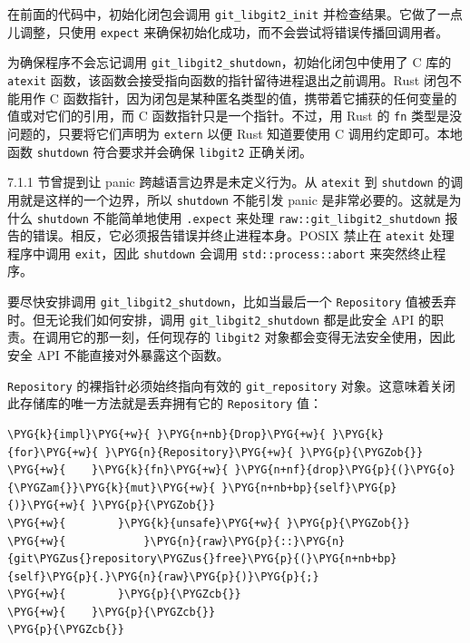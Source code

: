 在前面的代码中，初始化闭包会调用 \texttt{git\_libgit2\_init} 并检查结果。它做了一点儿调整，只使用 \texttt{expect} 来确保初始化成功，而不会尝试将错误传播回调用者。

为确保程序不会忘记调用 \texttt{git\_libgit2\_shutdown}，初始化闭包中使用了 C 库的 \texttt{atexit} 函数，该函数会接受指向函数的指针留待进程退出之前调用。Rust 闭包不能用作 C 函数指针，因为闭包是某种匿名类型的值，携带着它捕获的任何变量的值或对它们的引用，而 C 函数指针只是一个指针。不过，用 Rust 的 \texttt{fn} 类型是没问题的，只要将它们声明为 \texttt{extern} 以便 Rust 知道要使用 C 调用约定即可。本地函数 \texttt{shutdown} 符合要求并会确保 \texttt{libgit2} 正确关闭。

7.1.1 节曾提到让 panic 跨越语言边界是未定义行为。从 \texttt{atexit} 到 \texttt{shutdown} 的调用就是这样的一个边界，所以 \texttt{shutdown} 不能引发 panic 是非常必要的。这就是为什么 \texttt{shutdown} 不能简单地使用 \texttt{.expect} 来处理 \texttt{raw::git\_libgit2\_shutdown} 报告的错误。相反，它必须报告错误并终止进程本身。POSIX 禁止在 \texttt{atexit} 处理程序中调用 \texttt{exit}，因此 \texttt{shutdown} 会调用 \texttt{std::process::abort} 来突然终止程序。

要尽快安排调用 \texttt{git\_libgit2\_shutdown}，比如当最后一个 \texttt{Repository} 值被丢弃时。但无论我们如何安排，调用 \texttt{git\_libgit2\_shutdown} 都是此安全 API 的职责。在调用它的那一刻，任何现存的 \texttt{libgit2} 对象都会变得无法安全使用，因此安全 API 不能直接对外暴露这个函数。

\texttt{Repository} 的裸指针必须始终指向有效的 \texttt{git\_repository} 对象。这意味着关闭此存储库的唯一方法就是丢弃拥有它的 \texttt{Repository} 值：

\begin{Verbatim}[commandchars=\\\{\},breaklines=true,breakanywhere=true,fontsize=\codefont,xleftmargin=17bp]
\PYG{k}{impl}\PYG{+w}{ }\PYG{n+nb}{Drop}\PYG{+w}{ }\PYG{k}{for}\PYG{+w}{ }\PYG{n}{Repository}\PYG{+w}{ }\PYG{p}{\PYGZob{}}
\PYG{+w}{    }\PYG{k}{fn}\PYG{+w}{ }\PYG{n+nf}{drop}\PYG{p}{(}\PYG{o}{\PYGZam{}}\PYG{k}{mut}\PYG{+w}{ }\PYG{n+nb+bp}{self}\PYG{p}{)}\PYG{+w}{ }\PYG{p}{\PYGZob{}}
\PYG{+w}{        }\PYG{k}{unsafe}\PYG{+w}{ }\PYG{p}{\PYGZob{}}
\PYG{+w}{            }\PYG{n}{raw}\PYG{p}{::}\PYG{n}{git\PYGZus{}repository\PYGZus{}free}\PYG{p}{(}\PYG{n+nb+bp}{self}\PYG{p}{.}\PYG{n}{raw}\PYG{p}{)}\PYG{p}{;}
\PYG{+w}{        }\PYG{p}{\PYGZcb{}}
\PYG{+w}{    }\PYG{p}{\PYGZcb{}}
\PYG{p}{\PYGZcb{}}
\end{Verbatim}

